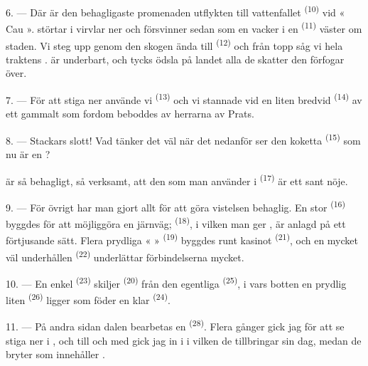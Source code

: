 \VUsaut{3.0mm}
\VUsaut{3.0mm}

6. --- Där är den behagligaste promenaden utflykten till vattenfallet \textsuperscript{(10)}
vid « Cau ».  störtar i virvlar ner och försvinner sedan som en vacker
 i en  \textsuperscript{(11)} väster om staden. Vi steg upp
genom den skogen ända till
 \textsuperscript{(12)} och från
 topp såg vi hela traktens .
 är underbart, och  tycks ödsla på landet alla
de skatter den förfogar över.

7. --- För att stiga ner använde vi  \textsuperscript{(13)} och vi stannade
vid en liten  bredvid  \textsuperscript{(14)} av ett gammalt
 som fordom beboddes av herrarna av Prats.

8. --- Stackars slott! Vad tänker det väl när det nedanför ser den koketta
 \textsuperscript{(15)} som nu är en ?

 är så behagligt,  så verksamt, att den
 som man använder i  \textsuperscript{(17)} är ett
sant nöje.

\VUsaut{3.0mm}
\VUsaut{3.0mm}

9. --- För övrigt har man gjort allt för att göra vistelsen behaglig. En stor
 \textsuperscript{(16)} byggdes för att möjliggöra en järnväg;
  \textsuperscript{(18)}, i vilken man ger
, är anlagd på ett förtjusande sätt. Flera prydliga
«  » \textsuperscript{(19)} byggdes runt kasinot \textsuperscript{(21)}, och en
mycket väl underhållen  \textsuperscript{(22)} underlättar förbindelserna
mycket.

10. --- En enkel  \textsuperscript{(23)} skiljer 
\textsuperscript{(20)} från den egentliga  \textsuperscript{(25)}, i vars botten
en prydlig liten  \textsuperscript{(26)} ligger som föder en klar 
\textsuperscript{(24)}.

11. --- På andra sidan dalen bearbetas en  \textsuperscript{(28)}. Flera
gånger gick jag för att se  stiga ner i , och till och
med gick jag in i  i vilken de tillbringar sin dag, medan de bryter
 som innehåller
.

